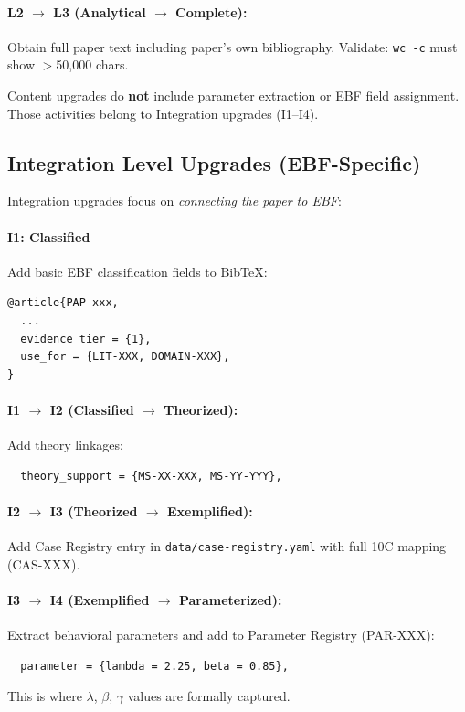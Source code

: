 \paragraph{L2 $\rightarrow$ L3 (Analytical $\rightarrow$ Complete):}
Obtain full paper text including paper's own bibliography. Validate: \texttt{wc -c} must show $>$50,000 chars.

\begin{tcolorbox}[colback=yellow!5!white, colframe=yellow!75!black,
    title=MECE Reminder: Content Upgrades]
Content upgrades do \textbf{not} include parameter extraction or EBF field assignment.
Those activities belong to Integration upgrades (I1--I4).
\end{tcolorbox}

\subsection{Integration Level Upgrades (EBF-Specific)}

Integration upgrades focus on \textit{connecting the paper to EBF}:

\paragraph{I1: Classified}
Add basic EBF classification fields to BibTeX:
\begin{verbatim}
@article{PAP-xxx,
  ...
  evidence_tier = {1},
  use_for = {LIT-XXX, DOMAIN-XXX},
}
\end{verbatim}

\paragraph{I1 $\rightarrow$ I2 (Classified $\rightarrow$ Theorized):}
\label{sec:upgrade-i2}
Add theory linkages:
\begin{verbatim}
  theory_support = {MS-XX-XXX, MS-YY-YYY},
\end{verbatim}

\paragraph{I2 $\rightarrow$ I3 (Theorized $\rightarrow$ Exemplified):}
\label{sec:upgrade-i3}
Add Case Registry entry in \texttt{data/case-registry.yaml} with full 10C mapping (CAS-XXX).

\paragraph{I3 $\rightarrow$ I4 (Exemplified $\rightarrow$ Parameterized):}
Extract behavioral parameters and add to Parameter Registry (PAR-XXX):
\begin{verbatim}
  parameter = {lambda = 2.25, beta = 0.85},
\end{verbatim}
This is where $\lambda$, $\beta$, $\gamma$ values are formally captured.

